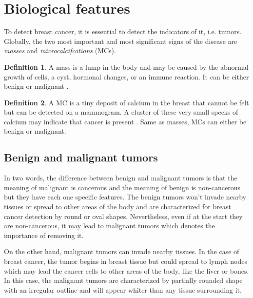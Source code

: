 \documentclass[11pt, openany]{report}
\theoremstyle{plain}
\theoremstyle{definition}
\newtheorem{defn}{Definition}[section]
\theoremstyle{remark}
\begin{document}
\section{Biological features}
To detect breast cancer, it is essential to detect the indicators of it, i.e. tumors. Globally, the two most important and most significant signs of the disease are \textit{masses} and \textit{microcalcifcations} (MCs).  

\begin{defn}
A mass is a lump in the body and may be caused by the abnormal growth of cells, a cyst, hormonal changes, or an immune reaction. It can be either benign or malignant \cite{NCI}.
\end{defn}  

\begin{defn}
A MC is a tiny deposit of calcium in the breast that cannot be felt but can be detected on a mammogram. A cluster of these very small specks of calcium may indicate that cancer is present \cite{NCI}. Same as masses, MCs can either be benign or malignant.  
\end{defn}

\subsection{Benign and malignant tumors}
In two words, the difference between benign and malignant tumors is that the meaning of malignant is cancerous and the meaning of benign is non-cancerous but they have each one specific features. The benign tumors won't invade nearby tissues or spread to other areas of the body and are characterized for breast cancer detection by round or oval shapes. Nevertheless, even if at the start they are non-cancerous, it may lead to malignant tumors which denotes the importance of removing it. 

On the other hand, malignant tumors can invade nearby tissues. In the case of breast cancer, the tumor begins in breast tissue but could spread to lymph nodes which may lead the cancer cells to other areas of the body, like the liver or bones. In this case, the malignant tumors are characterized by partially rounded shape with an irregular outline and will appear whiter than any tissue surrounding it.
\end{document}
